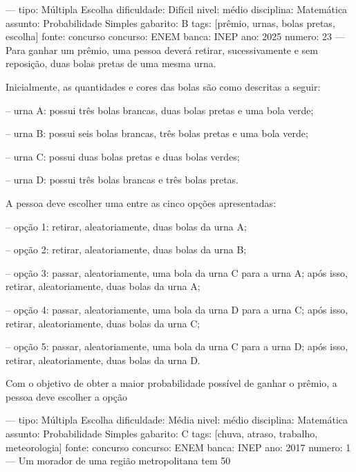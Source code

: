 ---
tipo: Múltipla Escolha
dificuldade: Difícil
nivel: médio
disciplina: Matemática
assunto: Probabilidade Simples
gabarito: B
tags: [prêmio, urnas, bolas pretas, escolha]
fonte: concurso
concurso: ENEM
banca: INEP
ano: 2025
numero: 23
---
\question
Para ganhar um prêmio, uma pessoa deverá retirar, sucessivamente e sem reposição, duas bolas pretas de uma mesma urna.

Inicialmente, as quantidades e cores das bolas são como descritas a seguir:

-- urna A: possui três bolas brancas, duas bolas pretas e uma bola verde;

-- urna B: possui seis bolas brancas, três bolas pretas e uma bola verde;

-- urna C: possui duas bolas pretas e duas bolas verdes;

-- urna D: possui três bolas brancas e três bolas pretas.

A pessoa deve escolher uma entre as cinco opções apresentadas:

-- opção 1: retirar, aleatoriamente, duas bolas da urna A;

-- opção 2: retirar, aleatoriamente, duas bolas da urna B;

-- opção 3: passar, aleatoriamente, uma bola da urna C para a urna A; após isso, retirar, aleatoriamente, duas bolas da urna A;

-- opção 4: passar, aleatoriamente, uma bola da urna D para a urna C; após isso, retirar, aleatoriamente, duas bolas da urna C;

-- opção 5: passar, aleatoriamente, uma bola da urna C para a urna D; após isso, retirar, aleatoriamente, duas bolas da urna D.

Com o objetivo de obter a maior probabilidade possível de ganhar o prêmio, a pessoa deve escolher a opção
\begin{oneparchoices}
\end{oneparchoices}

---
tipo: Múltipla Escolha
dificuldade: Média
nivel: médio
disciplina: Matemática
assunto: Probabilidade Simples
gabarito: C
tags: [chuva, atraso, trabalho, meteorologia]
fonte: concurso
concurso: ENEM
banca: INEP
ano: 2017
numero: 1
---
\question
Um morador de uma região metropolitana tem 50%

